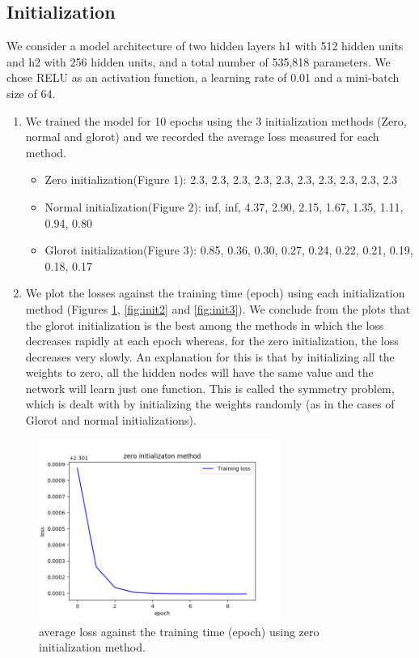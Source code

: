\documentclass[a4paper]{article}
\begin{document}
\subsection{Initialization}
We consider a model architecture of two hidden layers h1  with 512 hidden units and h2  with 256 hidden units, and a total number of 535,818 parameters. We chose RELU as an activation function, a learning rate of 0.01 and a mini-batch size of 64.
\begin{enumerate}
  \item We trained the model for 10 epochs using the 3 initialization methods (Zero, normal and glorot) and we recorded the average
loss measured for each method.

\begin{itemize}
  \item Zero initialization(Figure 1): 2.3, 2.3, 2.3, 2.3, 2.3, 2.3, 2.3, 2.3, 2.3, 2.3
  \item Normal initialization(Figure 2): inf, inf, 4.37, 2.90, 2.15, 1.67, 1.35, 1.11, 0.94, 0.80
  \item Glorot initialization(Figure 3): 0.85, 0.36, 0.30, 0.27, 0.24, 0.22, 0.21, 0.19, 0.18, 0.17
\end{itemize}

\item We plot the losses against the training time (epoch) using each initialization method (Figures \ref{fig:init1}, \ref{fig:init2} and \ref{fig:init3}). We conclude from the plots that the glorot initialization is the best among the methods in which the loss decreases rapidly at each epoch whereas, for the zero initialization, the loss decreases very slowly. An explanation for this is that by initializing all the weights to zero, all the hidden nodes will have the same value and the network will learn just one function. This is called the symmetry problem, which is dealt with by initializing the weights randomly (as in the cases of Glorot and normal initializations)\cite{weights}.

\end{enumerate}


\begin{figure}
\centering
\includegraphics[width=0.7\textwidth]{zero_init.png}
\caption{\label{fig:init1}average loss against the training time (epoch) using zero initialization method.}
\end{figure}
\end{document}
